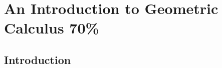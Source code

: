 \newcommand{\genf}{ {\textsf {f}} }
\newcommand{\dbar}{\underline{\d}}
\newcommand{\Fbar}{\underline{F}}
\newcommand{\fbar}{\underline{f}}
\newcommand{\fadj}{\adjoint{f}}
\newcommand{\Fadj}{\adjoint{F}}
\newcommand{\radj}{{\adjoint r}}
\newcommand{\psidot}{\dot{\psi}}
\renewcommand{\star}{\ast}
\renewcommand{\C}{{\cal C}}
\renewcommand{\L}{{\cal L}}

\chapter{An Introduction to Geometric Calculus 70\%}\label{ch:gc}

\section{Introduction}


